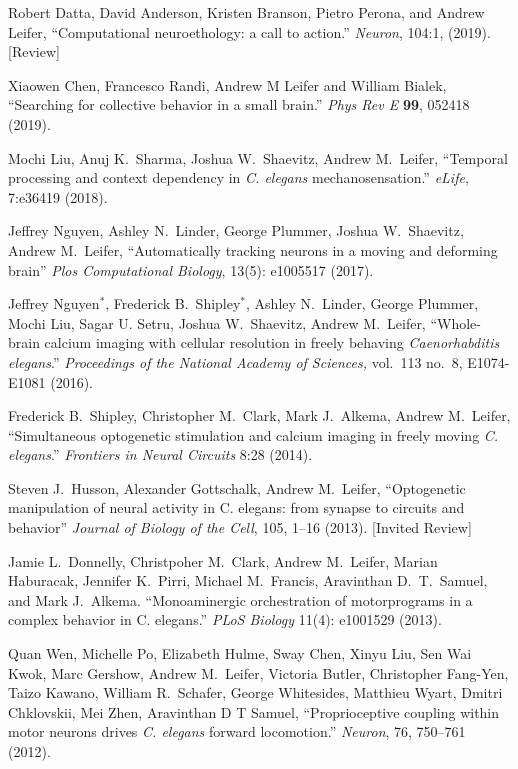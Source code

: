 \documentclass[11pt]{article}
\makeatletter
\newlength{\bibhang}
\newlength{\bibsep}
\newcounter{Lcount}
 {\@listi \global\bibsep\itemsep \global\advance\bibsep by\parsep}
\newenvironment{bibsection}%
        {\begin{list}{\arabic{Lcount}.}{%
       \usecounter{Lcount}%
       \setlength\labelwidth{-0.5em}%
       \setlength{\leftmargin}{\bibhang}%
       \setlength{\itemindent}{-\leftmargin}%
       \setlength{\itemsep}{\bibsep}%
       \setlength{\parsep}{\z@}%
        \setlength{\partopsep}{0pt}%
        \setlength{\topsep}{0pt}}}
        {\end{list}\vspace{-.6\baselineskip}}
\makeatother
\begin{document}
\begin{bibsection}
\item Robert Datta, David Anderson, Kristen Branson, Pietro Perona, and Andrew Leifer, ``Computational neuroethology: a call to action.'' \emph{Neuron}, 104:1, (2019). [Review]

\item Xiaowen Chen, Francesco Randi, Andrew M Leifer and William Bialek, ``Searching for collective behavior in a small brain.'' \emph{Phys Rev E} \textbf{99}, 052418 (2019).

\item Mochi Liu, Anuj K.~Sharma, Joshua W.~Shaevitz, Andrew M.~Leifer, ``Temporal processing and context dependency in \textit{C. elegans} mechanosensation.'' \emph{eLife}, 7:e36419 (2018).   

\item Jeffrey Nguyen,  Ashley N.~Linder, George Plummer, Joshua
W.~Shaevitz, Andrew M.~Leifer, ``Automatically tracking neurons in a moving and deforming brain'' \emph{Plos Computational Biology}, 13(5): e1005517 (2017).
	
\item Jeffrey Nguyen$^{*}$, Frederick B.~Shipley$^{*}$, Ashley N.~Linder, George Plummer, Mochi Liu, Sagar U. Setru, Joshua
W.~Shaevitz, Andrew M.~Leifer, ``Whole-brain calcium imaging with cellular resolution in freely behaving \textit{Caenorhabditis elegans}.'' \emph{Proceedings of the National Academy of Sciences,}  vol.~113 no.~8, E1074-E1081 (2016). 

\item Frederick B.~Shipley, Christopher M.~Clark,  Mark J.~Alkema, Andrew M.~Leifer, ``Simultaneous optogenetic stimulation and calcium imaging in freely moving \textit{C. elegans}.'' \emph{Frontiers in Neural Circuits} 8:28 (2014).
	
\item Steven J.~Husson, Alexander Gottschalk, Andrew M.~Leifer, ``Optogenetic manipulation of neural activity in C. elegans: from synapse to circuits and behavior'' \emph{Journal of Biology of the Cell}, 105, 1--16 (2013).  [Invited Review]

\item Jamie L.~Donnelly, Christpoher M.~Clark, Andrew M.~Leifer, Marian Haburacak, Jennifer K.~Pirri, Michael M.~Francis, Aravinthan D.~T.~Samuel, and Mark J.~Alkema. ``Monoaminergic orchestration of motorprograms in a complex behavior in C. elegans.'' \emph{PLoS Biology}  11(4): e1001529 (2013).	

\item Quan Wen, Michelle Po, Elizabeth Hulme, Sway Chen, Xinyu Liu, Sen Wai Kwok, Marc Gershow,  Andrew M.~Leifer, Victoria Butler, Christopher Fang-Yen, Taizo Kawano, William R.~Schafer, George Whitesides, Matthieu Wyart, Dmitri Chklovskii, Mei Zhen, Aravinthan D T Samuel, ``Proprioceptive coupling within motor neurons drives \emph{C. elegans} forward locomotion.'' \emph{Neuron}, 76, 750--761 (2012).


\end{bibsection}
\end{document}
